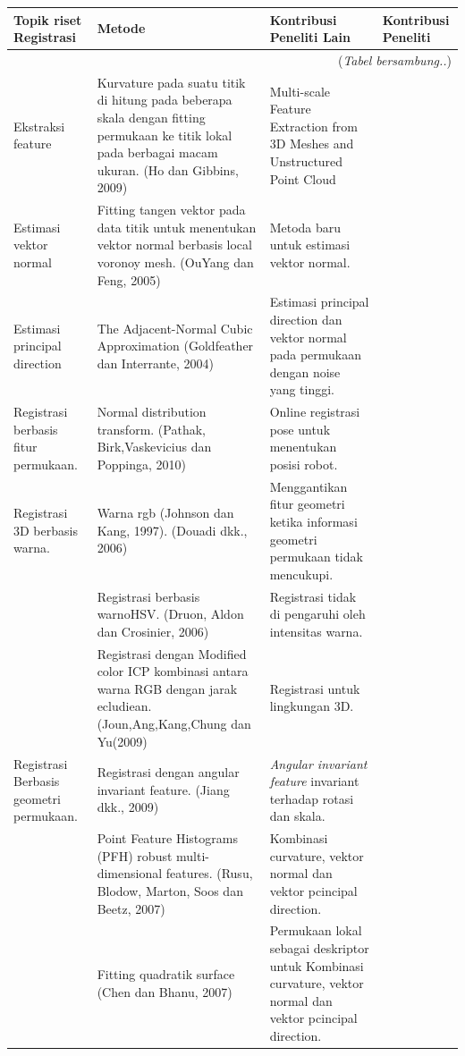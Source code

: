 \begin{landscape}
\begin{spacing}{1}
\begin{longtable}{|p{3cm}| p{7cm} | p{7cm} | p{7cm}|}
	\nohyphens{\textbf{Topik riset Registrasi}}  & \textbf{Metode}  &\nohyphens{\textbf{Kontribusi Peneliti Lain}}&\nohyphens{\textbf{Kontribusi Peneliti}} \\ 
	\hline
	\endhead
	\multicolumn{4}{r}{{(\textit{Tabel bersambung..})}} \\
	\endfoot
	\endlastfoot 
	Ekstraksi feature& 	Kurvature  pada suatu titik di hitung pada beberapa skala dengan fitting  permukaan ke  titik lokal pada berbagai macam ukuran. (Ho dan Gibbins, 2009) & 	Multi-scale  Feature Extraction from 3D Meshes and Unstructured Point Cloud& \\ \hline 
	Estimasi vektor normal& 	Fitting tangen vektor pada  data titik untuk menentukan vektor normal berbasis local voronoy mesh. (OuYang dan Feng, 2005) & 	Metoda baru untuk estimasi vektor normal. & \\ \hline 
	Estimasi principal direction& 	The Adjacent-Normal Cubic Approximation 
	(Goldfeather dan Interrante, 2004) & 	Estimasi principal direction dan vektor normal pada permukaan dengan noise yang tinggi.&\\ \hline 
	Registrasi berbasis fitur permukaan. & 	Normal distribution transform.
	(Pathak, Birk,Vaskevicius dan Poppinga, 2010) & 	Online registrasi pose untuk menentukan posisi robot. & 	 \\ \hline 
	Registrasi 3D berbasis warna. & 	Warna rgb (Johnson dan Kang, 1997). 
	(Douadi dkk., 2006) & 	Menggantikan fitur geometri ketika informasi geometri permukaan tidak mencukupi. & 	\\ \hline 
	& 	Registrasi berbasis warnoHSV. (Druon, Aldon dan Crosinier, 2006) & 	Registrasi tidak di pengaruhi oleh intensitas warna. & 	\\ \hline 
	& 	Registrasi dengan Modified color ICP kombinasi antara warna RGB dengan jarak ecludiean.  (Joun,Ang,Kang,Chung dan Yu(2009) & 	Registrasi untuk lingkungan 3D. & 	\\ \hline 
	Registrasi Berbasis geometri permukaan.& 	Registrasi dengan angular invariant feature.  (Jiang dkk., 2009) & 	\textit{Angular  invariant feature} invariant terhadap rotasi dan skala. & 	\\ \hline 
	& 	Point  Feature Histograms (PFH)  robust multi-dimensional features. (Rusu, Blodow, Marton, Soos dan Beetz, 2007) & 	Kombinasi curvature, vektor normal dan vektor pcincipal direction. & 	\\ \hline 
	& 	Fitting quadratik surface  (Chen dan Bhanu, 2007) & 	Permukaan lokal sebagai deskriptor untuk Kombinasi curvature, vektor normal dan vektor pcincipal direction. & 	\\ \hline 

\end{longtable}
\end{spacing}
\end{landscape}
